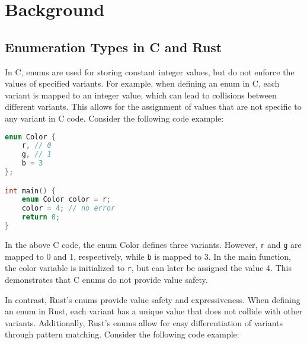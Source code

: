 \documentclass[10pt,conference]{IEEEtran}
\begin{document}

\section{Background}

\subsection{Enumeration Types in C and Rust}

In C, enums are used for storing constant integer values, but do not enforce the values of specified variants. For example, when defining an enum in C, each variant is mapped to an integer value, which can lead to collisions between different variants. This allows for the assignment of values that are not specific to any variant in C code. Consider the following code example:

\begin{lstlisting}[language=C]
enum Color {
    r, // 0
    g, // 1
    b = 3
};

int main() {
    enum Color color = r;
    color = 4; // no error
    return 0;
}
\end{lstlisting}

In the above C code, the enum Color defines three variants. However, \texttt{r} and \texttt{g} are mapped to 0 and 1, respectively, while \texttt{b} is mapped to 3. In the main function, the color variable is initialized to \texttt{r}, but can later be assigned the value 4. This demonstrates that C enums do not provide value safety.

In contrast, Rust's enums provide value safety and expressiveness. When defining an enum in Rust, each variant has a unique value that does not collide with other variants. Additionally, Rust's enums allow for easy differentiation of variants through pattern matching. Consider the following code example:
\end{document}
